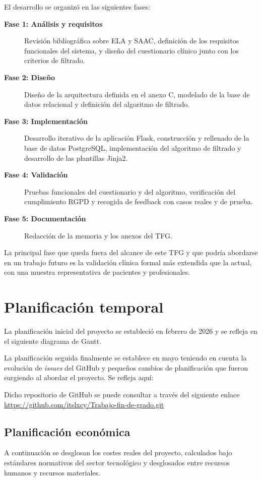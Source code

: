El desarrollo se organizó en las siguientes fases:
\begin{description}
	\item[\textbf{Fase 1: Análisis y requisitos}] Revisión bibliográfica sobre ELA y SAAC, definición de los requisitos funcionales del sistema, y diseño del cuestionario clínico junto con los criterios de filtrado.
	\item[\textbf{Fase 2: Diseño}] Diseño de la arquitectura definida en el anexo C, modelado de la base de datos relacional y definición del algoritmo de filtrado.
	\item[\textbf{Fase 3: Implementación}] Desarrollo iterativo de la aplicación Flask, construcción y rellenado de la base de datos PostgreSQL, implementación del algoritmo de filtrado y desarrollo de las plantillas Jinja2.
	\item[\textbf{Fase 4: Validación}] Pruebas funcionales del cuestionario y del algoritmo, verificación del cumplimiento RGPD y recogida de feedback con casos reales y de prueba.
	\item[\textbf{Fase 5: Documentación}] Redacción de la memoria y los anexos del TFG.
\end{description}

La principal fase que queda fuera del alcance de este TFG y que podría abordarse en un trabajo futuro es la validación clínica formal más extendida que la actual, con una muestra representativa de pacientes y profesionales.

\section{Planificación temporal}
La planificación inicial del proyecto se estableció en febrero de 2026 y se refleja en el siguiente diagrama de Gantt.


La planificación seguida finalmente se establece en mayo teniendo en cuenta la evolución de \textit{issues} del GitHub y pequeños cambios de planificación que fueron surgiendo al abordar el proyecto. Se refleja aquí:

Dicho repositorio de GitHub se puede consultar a través del siguiente enlace  \url{https://github.com/itslxcy/Trabajo-fin-de-grado.git}

\subsection{Planificación económica}
A continuación se desglosan los costes reales del proyecto, calculados bajo estándares normativos del sector tecnológico y desglosados entre recursos humanos y recursos materiales.

